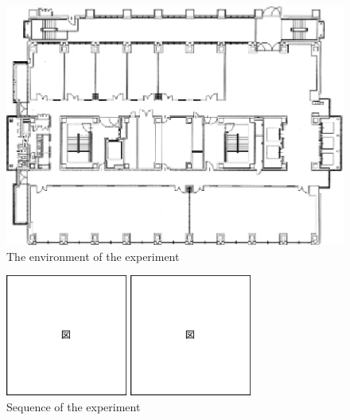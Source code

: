   \begin{figure}[h]
    \centering
    \includegraphics[keepaspectratio, scale=0.70] {images/eps/RobotGuidance_cit3f}
    \captionsetup{justification=raggedright} %
    \caption{The environment of the experiment}
    \label{Fig:RobotGuidance_cit3f}
  \end{figure}

  \begin{figure}[h]
    \centering
    \begin{minipage}[c]{65mm} 
        \centering
        \includegraphics[height=40mm]{images/eps/figure}
    \end{minipage}
    \begin{minipage}[c]{65mm} 
        \centering
        \includegraphics[height=40mm]{images/eps/figure}
    \end{minipage}
    \caption{Sequence of the experiment}
    \label{Fig:Sequence of the experiment}
  \end{figure}

\newpage
